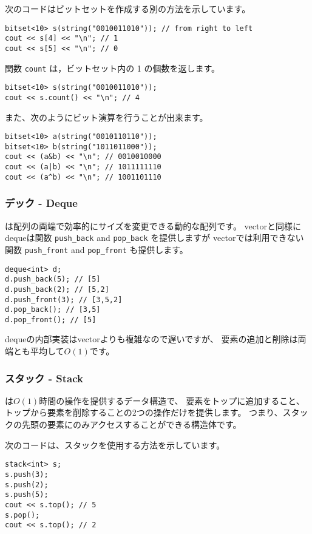 次のコードはビットセットを作成する別の方法を示しています。
\begin{lstlisting}
bitset<10> s(string("0010011010")); // from right to left
cout << s[4] << "\n"; // 1
cout << s[5] << "\n"; // 0
\end{lstlisting}

関数 \texttt{count} は，ビットセット内の 1 の個数を返します。
\begin{lstlisting}
bitset<10> s(string("0010011010"));
cout << s.count() << "\n"; // 4
\end{lstlisting}

また、次のようにビット演算を行うことが出来ます。
\begin{lstlisting}
bitset<10> a(string("0010110110"));
bitset<10> b(string("1011011000"));
cout << (a&b) << "\n"; // 0010010000
cout << (a|b) << "\n"; // 1011111110
cout << (a^b) << "\n"; // 1001101110
\end{lstlisting}

\subsubsection{デック - Deque}


 は配列の両端で効率的にサイズを変更できる動的な配列です。
vectorと同様にdequeは関数 \texttt{push\_back} and \texttt{pop\_back} を提供しますが
vectorでは利用できない関数 \texttt{push\_front} and \texttt{pop\_front} も提供します。
\begin{lstlisting}
deque<int> d;
d.push_back(5); // [5]
d.push_back(2); // [5,2]
d.push_front(3); // [3,5,2]
d.pop_back(); // [3,5]
d.pop_front(); // [5]
\end{lstlisting}

dequeの内部実装はvectorよりも複雑なので遅いですが、
要素の追加と削除は両端とも平均して$O(1)$です。

\subsubsection{スタック - Stack}


は$O(1)$時間の操作を提供するデータ構造で、
要素をトップに追加すること、トップから要素を削除することの2つの操作だけを提供します。
つまり、スタックの先頭の要素にのみアクセスすることができる構造体です。

次のコードは、スタックを使用する方法を示しています。
\begin{lstlisting}
stack<int> s;
s.push(3);
s.push(2);
s.push(5);
cout << s.top(); // 5
s.pop();
cout << s.top(); // 2
\end{lstlisting}

